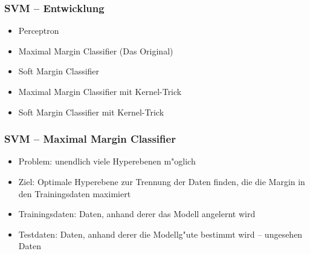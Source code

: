 
\begin{frame}

\frametitle{SVM -- Entwicklung}

\begin{itemize}
	\setlength{\itemsep}{15pt}
	\item Perceptron
	\item Maximal Margin Classifier (Das Original)
	\item Soft Margin Classifier
	\item Maximal Margin Classifier mit Kernel-Trick
	\item Soft Margin Classifier mit Kernel-Trick
\end{itemize}

\end{frame}







\begin{frame}

\frametitle{SVM -- Maximal Margin Classifier}

\begin{itemize}
	\setlength{\itemsep}{10pt}
	\item Problem: unendlich viele Hyperebenen m"oglich
	\item Ziel: Optimale Hyperebene zur Trennung der Daten finden, die die Margin in den Trainingsdaten maximiert
	\item Trainingsdaten: Daten, anhand derer das Modell angelernt wird
	\item Testdaten: Daten, anhand derer die Modellg"ute bestimmt wird -- \glqq ungesehen Daten\grqq
\end{itemize}

\end{frame}







